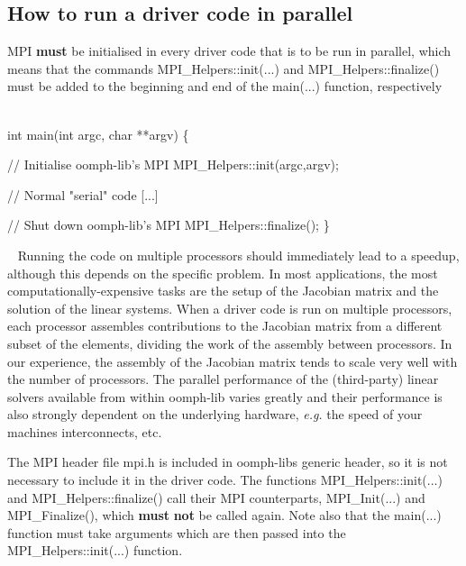 \hypertarget{index_running}{}\subsection{How to run a driver code in parallel}\label{index_running}

\begin{DoxyItemize}
\item M\+PI {\bfseries  must } be initialised in every driver code that is to be run in parallel, which means that the commands {\ttfamily M\+P\+I\+\_\+\+Helpers\+::init}(...) and {\ttfamily M\+P\+I\+\_\+\+Helpers\+::finalize()} must be added to the beginning and end of the {\ttfamily main}(...) function, respectively ~\newline
~\newline

\begin{DoxyCode}
\textcolor{keywordtype}{int} main(\textcolor{keywordtype}{int} argc, \textcolor{keywordtype}{char} **argv)
  \{ 

    \textcolor{comment}{// Initialise oomph-lib's MPI       }
    MPI\_Helpers::init(argc,argv);     
  

    \textcolor{comment}{// Normal "serial" code}
    [...]  

    
    \textcolor{comment}{// Shut down oomph-lib's MPI}
    MPI\_Helpers::finalize();
  \}
\end{DoxyCode}
 ~\newline
 Running the code on multiple processors should immediately lead to a speedup, although this depends on the specific problem. In most applications, the most computationally-\/expensive tasks are the setup of the Jacobian matrix and the solution of the linear systems. When a driver code is run on multiple processors, each processor assembles contributions to the Jacobian matrix from a different subset of the elements, dividing the work of the assembly between processors. In our experience, the assembly of the Jacobian matrix tends to scale very well with the number of processors. The parallel performance of the (third-\/party) linear solvers available from within {\ttfamily oomph-\/lib} varies greatly and their performance is also strongly dependent on the underlying hardware, {\itshape  e.\+g.} the speed of your machine\textquotesingle{}s interconnects, etc. ~\newline
~\newline

\item The M\+PI header file {\ttfamily mpi.\+h} is included in {\ttfamily oomph-\/lib\textquotesingle{}s} generic header, so it is not necessary to include it in the driver code. The functions {\ttfamily M\+P\+I\+\_\+\+Helpers\+::init}(...) and {\ttfamily M\+P\+I\+\_\+\+Helpers\+::finalize()} call their M\+PI counterparts, {\ttfamily M\+P\+I\+\_\+\+Init}(...) and {\ttfamily M\+P\+I\+\_\+\+Finalize()}, which {\bfseries must} {\bfseries not} be called again. Note also that the {\ttfamily main}(...) function must take arguments which are then passed into the {\ttfamily M\+P\+I\+\_\+\+Helpers\+::init}(...) function. ~\newline
~\newline


\end{DoxyItemize}
